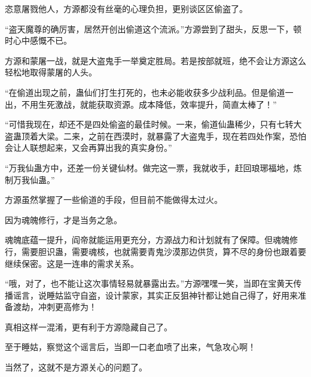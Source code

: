 \begin{this_body}
恣意屠戮他人，方源都没有丝毫的心理负担，更别谈区区偷盗了。

“盗天魔尊的确厉害，居然开创出偷道这个流派。”方源尝到了甜头，反思一下，顿时心中感慨不已。

方源和蒙屠一战，就是大盗鬼手一举奠定胜局。若是按部就班，绝不会让方源这么轻松地取得蒙屠的人头。

“在偷道出现之前，蛊仙们打生打死的，也未必能收获多少战利品。但是偷道一出，不用生死激战，就能获取资源。成本降低，效率提升，简直太棒了！”

“可惜我现在，却还不是四处偷盗的最佳时候。一来，偷道仙蛊稀少，只有七转大盗蛊顶着大梁。二来，之前在西漠时，就暴露了大盗鬼手，现在若四处作案，恐怕会让人联想起来，又会再算出我的真实身份。”

“万我仙蛊方中，还差一份关键仙材。做完这一票，我就收手，赶回琅琊福地，炼制万我仙蛊。”

方源虽然掌握了一些偷道的手段，但目前不能做得太过火。

因为魂魄修行，才是当务之急。

魂魄底蕴一提升，阎帝就能运用更充分，方源战力和计划就有了保障。但魂魄修行，需要胆识蛊，需要魂核，也就需要青鬼沙漠那边供货，算不尽的身份也跟着要继续保密。这是一连串的需求关系。

“哦，对了，也不能让这次事情轻易就暴露出去。”方源嘿嘿一笑，当即在宝黄天传播谣言，说睡姑监守自盗，设计蒙家，其实正反狙神针都让她自己得了，好用来准备渡劫，冲刺更高修为！

真相这样一混淆，更有利于方源隐藏自己了。

至于睡姑，察觉这个谣言后，当即一口老血喷了出来，气急攻心啊！

当然了，这就不是方源关心的问题了。

\end{this_body}

